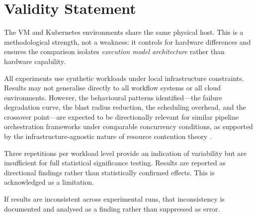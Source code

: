 
\section{Validity Statement}
\label{sec:validity}

The VM and Kubernetes environments share the same physical host. This is a methodological strength, not a weakness: it controls for hardware differences and ensures the comparison isolates \emph{execution model architecture} rather than hardware capability.

All experiments use synthetic workloads under local infrastructure constraints. Results may not generalise directly to all workflow systems or all cloud environments. However, the behavioural patterns identified---the failure degradation curve, the blast radius reduction, the scheduling overhead, and the crossover point---are expected to be directionally relevant for similar pipeline orchestration frameworks under comparable concurrency conditions, as supported by the infrastructure-agnostic nature of resource contention theory \citep{nanda1991}.

Three repetitions per workload level provide an indication of variability but are insufficient for full statistical significance testing. Results are reported as directional findings rather than statistically confirmed effects. This is acknowledged as a limitation.

If results are inconsistent across experimental runs, that inconsistency is documented and analysed as a finding rather than suppressed as error.
